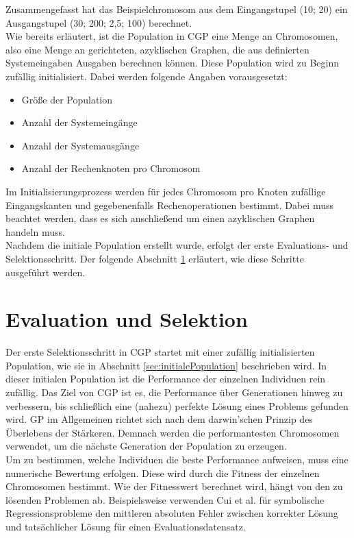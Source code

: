 Zusammengefasst hat das Beispielchromosom aus dem Eingangstupel (10; 20) ein Ausgangstupel (30; 200; 2,5; 100) berechnet.\\

Wie bereits erläutert, ist die Population in CGP eine Menge an Chromosomen, also eine Menge an gerichteten, azyklischen Graphen, die aus definierten Systemeingaben Ausgaben berechnen können.
Diese Population wird zu Beginn zufällig initialisiert.
Dabei werden folgende Angaben vorausgesetzt:
\begin{itemize}
    \item Größe der Population
    \item Anzahl der Systemeingänge
    \item Anzahl der Systemausgänge
    \item Anzahl der Rechenknoten pro Chromosom
\end{itemize}
Im Initialisierungsprozess werden für jedes Chromosom pro Knoten zufällige Eingangskanten und gegebenenfalls Rechenoperationen bestimmt.
Dabei muss beachtet werden, dass es sich anschließend um einen azyklischen Graphen handeln muss.\\

Nachdem die initiale Population erstellt wurde, erfolgt der erste Evaluations- und Selektionsschritt. 
Der folgende Abschnitt \ref{sec:evalUndSelektion} erläutert, wie diese Schritte ausgeführt werden.


\section{Evaluation und Selektion}
\label{sec:evalUndSelektion}

Der erste Selektionsschritt in CGP startet mit einer zufällig initialisierten Population, wie sie in Abschnitt \ref{sec:initialePopulation} beschrieben wird.
In dieser initialen Population ist die Performance der einzelnen Individuen rein zufällig.
Das Ziel von CGP ist es, die Performance über Generationen hinweg zu verbessern, bis schließlich eine (nahezu) perfekte Lösung eines Problems gefunden wird.
GP im Allgemeinen richtet sich nach dem darwin'schen Prinzip des Überlebens der Stärkeren.
Demnach werden die performantesten Chromosomen verwendet, um die nächste Generation der Population zu erzeugen. \cite{koza_survey_1995}\\

Um zu bestimmen, welche Individuen die beste Performance aufweisen, muss eine numerische Bewertung erfolgen.
Diese wird durch die Fitness der einzelnen Chromosomen bestimmt. \cite{koza_survey_1995}
Wie der Fitnesswert berechnet wird, hängt von den zu lösenden Problemen ab.
Beispielsweise verwenden Cui et al. für symbolische Regressionsprobleme den mittleren absoluten Fehler zwischen korrekter Lösung und tatsächlicher Lösung für einen Evaluationsdatensatz. \cite{affenzeller_positional_2024}\\


